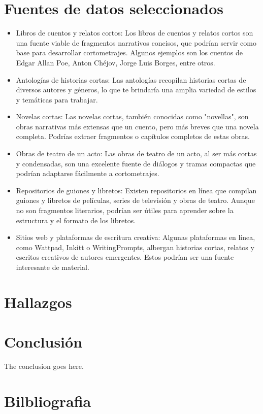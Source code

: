 \documentclass[journal,onecolumn]{IEEEtran}
\begin{document}
	\section{Fuentes de datos seleccionados}
	\begin{itemize}
		\item Libros de cuentos y relatos cortos: Los libros de cuentos y relatos cortos son una fuente viable de fragmentos narrativos concisos, que podrían servir como base para desarrollar cortometrajes. Algunos ejemplos son los cuentos de Edgar Allan Poe, Anton Chéjov, Jorge Luis Borges, entre otros.
		\item Antologías de historias cortas: Las antologías recopilan historias cortas de diversos autores y géneros, lo que te brindaría una amplia variedad de estilos y temáticas para trabajar.
		\item Novelas cortas: Las novelas cortas, también conocidas como "novellas", son obras narrativas más extensas que un cuento, pero más breves que una novela completa. Podrías extraer fragmentos o capítulos completos de estas obras.
		\item Obras de teatro de un acto: Las obras de teatro de un acto, al ser más cortas y condensadas, son una excelente fuente de diálogos y tramas compactas que podrían adaptarse fácilmente a cortometrajes.
		\item Repositorios de guiones y libretos: Existen repositorios en línea que compilan guiones y libretos de películas, series de televisión y obras de teatro. Aunque no son fragmentos literarios, podrían ser útiles para aprender sobre la estructura y el formato de los libretos.
		\item Sitios web y plataformas de escritura creativa: Algunas plataformas en línea, como Wattpad, Inkitt o WritingPrompts, albergan historias cortas, relatos y escritos creativos de autores emergentes. Estos podrían ser una fuente interesante de material.
	\end{itemize}
	\section{Hallazgos}
	
	\section{Conclusión}
	The conclusion goes here.
	
	\section{Bilbliografia}
	
\end{document}
